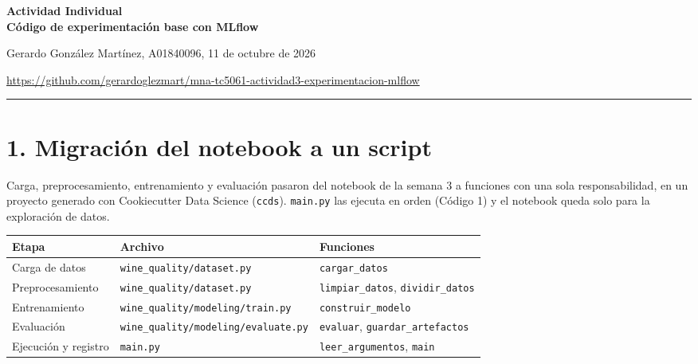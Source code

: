 \documentclass[11pt,letterpaper]{article}
\newcommand{\shell}[1]{\texttt{\small #1}}
\begin{document}
\begin{center}
  {\Large\bfseries Actividad Individual\\
  Código de experimentación base con MLflow}

  \vspace{2pt}
  {\small Gerardo González Martínez, A01840096, 11 de octubre de 2026}

  \vspace{2pt}
  {\small \url{https://github.com/gerardoglezmart/mna-tc5061-actividad3-experimentacion-mlflow}}
\end{center}

\vspace{-6pt}
\hrule
\vspace{4pt}

\section*{1. Migración del notebook a un script}

Carga, preprocesamiento, entrenamiento y evaluación pasaron del notebook de la semana 3 a
funciones con una sola responsabilidad, en un proyecto generado con Cookiecutter Data Science
(\shell{ccds}). \shell{main.py} las ejecuta en orden (Código 1) y el notebook queda solo para
la exploración de datos.

\begin{table}[H]
\centering\small
\begin{tabular}{@{}lll@{}}
\toprule
\textbf{Etapa} & \textbf{Archivo} & \textbf{Funciones} \\
\midrule
Carga de datos & \shell{wine\_quality/dataset.py} & \shell{cargar\_datos} \\
Preprocesamiento & \shell{wine\_quality/dataset.py} & \shell{limpiar\_datos}, \shell{dividir\_datos} \\
Entrenamiento & \shell{wine\_quality/modeling/train.py} & \shell{construir\_modelo} \\
Evaluación & \shell{wine\_quality/modeling/evaluate.py} & \shell{evaluar}, \shell{guardar\_artefactos} \\
Ejecución y registro & \shell{main.py} & \shell{leer\_argumentos}, \shell{main} \\
\bottomrule
\end{tabular}
\end{table}

\par\noindent\begin{minipage}{\linewidth}

\end{minipage}\par\vspace{6pt}
\end{document}
